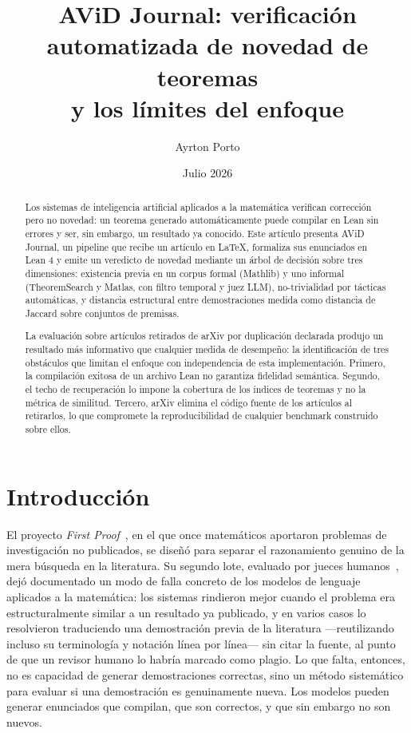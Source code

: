 \documentclass[12pt,a4paper]{article}
\title{AViD Journal: verificación automatizada de novedad de teoremas\\
y los límites del enfoque}
\author{Ayrton Porto}
\date{Julio 2026}
\theoremstyle{remark}
\begin{document}
\maketitle

\begin{abstract}
Los sistemas de inteligencia artificial aplicados a la matemática verifican corrección pero no novedad: un teorema generado automáticamente puede compilar en Lean sin errores y ser, sin embargo, un resultado ya conocido. Este artículo presenta AViD Journal, un pipeline que recibe un artículo en LaTeX, formaliza sus enunciados en Lean 4 y emite un veredicto de novedad mediante un árbol de decisión sobre tres dimensiones: existencia previa en un corpus formal (Mathlib) y uno informal (TheoremSearch y Matlas, con filtro temporal y juez LLM), no-trivialidad por tácticas automáticas, y distancia estructural entre demostraciones medida como distancia de Jaccard sobre conjuntos de premisas.

La evaluación sobre artículos retirados de arXiv por duplicación declarada produjo un resultado más informativo que cualquier medida de desempeño: la identificación de tres obstáculos que limitan el enfoque con independencia de esta implementación. Primero, la compilación exitosa de un archivo Lean no garantiza fidelidad semántica. Segundo, el techo de recuperación lo impone la cobertura de los índices de teoremas y no la métrica de similitud. Tercero, arXiv elimina el código fuente de los artículos al retirarlos, lo que compromete la reproducibilidad de cualquier benchmark construido sobre ellos.
\end{abstract}

\section{Introducción}

El proyecto \textit{First Proof}~\cite{abouzaid2026}, en el que once matemáticos aportaron problemas de investigación no publicados, se diseñó para separar el razonamiento genuino de la mera búsqueda en la literatura. Su segundo lote, evaluado por jueces humanos~\cite{firstproof2b}, dejó documentado un modo de falla concreto de los modelos de lenguaje aplicados a la matemática: los sistemas rindieron mejor cuando el problema era estructuralmente similar a un resultado ya publicado, y en varios casos lo resolvieron traduciendo una demostración previa de la literatura ---reutilizando incluso su terminología y notación línea por línea--- sin citar la fuente, al punto de que un revisor humano lo habría marcado como plagio. Lo que falta, entonces, no es capacidad de generar demostraciones correctas, sino un método sistemático para evaluar si una demostración es genuinamente nueva. Los modelos pueden generar enunciados que compilan, que son correctos, y que sin embargo no son nuevos.
\end{document}
